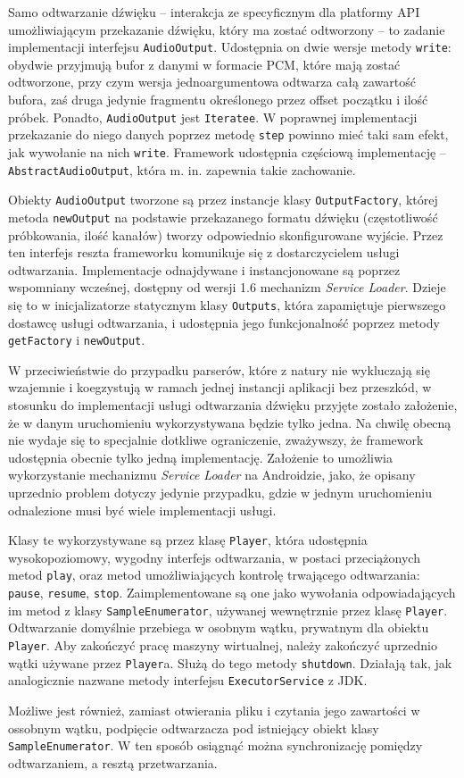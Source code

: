 

Samo odtwarzanie dźwięku -- interakcja ze specyficznym dla platformy API umożliwiającym przekazanie
dźwięku, który ma zostać odtworzony -- to zadanie implementacji interfejsu \texttt{AudioOutput}.
Udostępnia on dwie wersje metody \texttt{write}: obydwie przyjmują bufor z danymi w formacie PCM,
które mają zostać odtworzone, przy czym wersja jednoargumentowa odtwarza całą zawartość bufora, zaś
druga jedynie fragmentu określonego przez offset początku i ilość próbek. Ponadto,
\texttt{AudioOutput} jest \texttt{Iteratee}. W poprawnej implementacji przekazanie do niego danych
poprzez metodę \texttt{step} powinno mieć taki sam efekt, jak wywołanie na nich \texttt{write}.
Framework udostępnia częściową implementację -- \texttt{AbstractAudioOutput}, która m. in. zapewnia
takie zachowanie.

Obiekty \texttt{AudioOutput} tworzone są przez instancje klasy \texttt{OutputFactory}, której metoda
\texttt{newOutput} na podstawie przekazanego formatu dźwięku (częstotliwość próbkowania, ilość
kanałów) tworzy odpowiednio skonfigurowane wyjście. Przez ten interfejs reszta frameworku komunikuje
się z dostarczycielem usługi odtwarzania. Implementacje odnajdywane i instancjonowane są poprzez
wspomniany wcześnej, dostępny od wersji 1.6 mechanizm \emph{Service Loader}. Dzieje się to w
inicjalizatorze statycznym klasy \texttt{Outputs}, która zapamiętuje pierwszego dostawcę usługi
odtwarzania, i udostępnia jego funkcjonalność poprzez metody \texttt{getFactory} i
\texttt{newOutput}.

\begin{Note}
W przeciwieństwie do przypadku parserów, które z natury nie wykluczają się wzajemnie i koegzystują w
ramach jednej instancji aplikacji bez przeszkód, w stosunku do implementacji usługi odtwarzania
dźwięku przyjęte zostało założenie, że w danym uruchomieniu wykorzystywana będzie tylko jedna. Na
chwilę obecną nie wydaje się to specjalnie dotkliwe ograniczenie, zważywszy, że framework udostępnia
obecnie tylko jedną implementację. Założenie to umożliwia wykorzystanie mechanizmu \emph{Service
Loader} na Androidzie, jako, że opisany uprzednio problem dotyczy jedynie przypadku, gdzie w jednym
uruchomieniu odnalezione musi być wiele implementacji usługi.
\end{Note}

Klasy te wykorzystywane są przez klasę \texttt{Player}, która udostępnia wysokopoziomowy, wygodny
interfejs odtwarzania, w postaci przeciążonych metod \texttt{play}, oraz metod umożliwiających
kontrolę trwającego odtwarzania: \texttt{pause}, \texttt{resume}, \texttt{stop}. Zaimplementowane są
one jako wywołania odpowiadających im metod z klasy \texttt{SampleEnumerator}, używanej wewnętrznie
przez klasę \texttt{Player}. Odtwarzanie domyślnie przebiega w osobnym wątku, prywatnym dla obiektu
\texttt{Player}. Aby zakończyć pracę maszyny wirtualnej, należy zakończyć uprzednio wątki używane
przez \texttt{Player}a. Służą do tego metody \texttt{shutdown}. Działają tak, jak analogicznie
nazwane metody interfejsu \texttt{ExecutorService} z JDK.

Możliwe jest również, zamiast otwierania pliku i czytania jego zawartości w ossobnym wątku,
podpięcie odtwarzacza pod istniejący obiekt klasy \texttt{SampleEnumerator}. W ten sposób osiągnąć
można synchronizację pomiędzy odtwarzaniem, a resztą przetwarzania.
